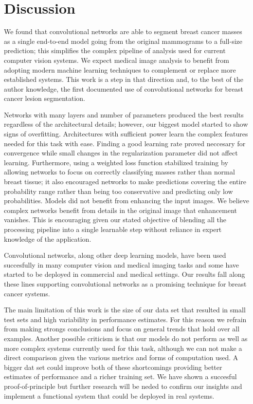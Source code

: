 \section{Discussion}
We found that convolutional networks are able to segment breast cancer masses as a single end-to-end model going from the original mammograms to a full-size prediction; this simplifies the complex pipeline of analysis used for current computer vision systems. We expect medical image analysis to benefit from adopting modern machine learning techniques to complement or replace more established systems. This work is a step in that direction and, to the best of the author knowledge, the first documented use of convolutional networks for breast cancer lesion segmentation.

Networks with many layers and number of parameters produced the best results regardless of the architectural details; however, our biggest model started to show signs of overfitting. Architectures with sufficient power learn the complex features needed for this task with ease. Finding a good learning rate proved neccesary for convergence while small changes in the regularization parameter did not affect learning.
Furthermore, using a weighted loss function stabilized training by allowing networks to focus on correctly classifying masses rather than normal breast tissue; it also encouraged networks to make predictions covering the entire probability range rather than being too conservative and predicting only low probabilities.
Models did not benefit from enhancing the input images. We believe complex networks benefit from details in the original image that enhancement vanishes. This is encouraging given our stated objective of blending all the processing pipeline into a single learnable step without reliance in expert knowledge of the application.

Convolutional networks, along other deep learning models, have been used succesfully in many computer vision and medical imaging tasks and some have started to be deployed in commercial and medical settings. Our results fall along these lines supporting convolutional networks as a promising technique for breast cancer systems.

The main limitation of this work is the size of our data set that resulted in small test sets and high variability in performance estimates. For this reason we refrain from making strongs conclusions and focus on general trends that hold over all examples. Another possible criticism is that our models do not perform as well as more complex systems currently used for this task, although we can not make a direct comparison given the various metrics and forms of computation used. A bigger dat set could improve both of these shortcomings providing better estimates of performance and a richer training set. We have shown a succesful proof-of-principle but further research will be neded to confirm our insights and implement a functional system that could be deployed in real systems. %

